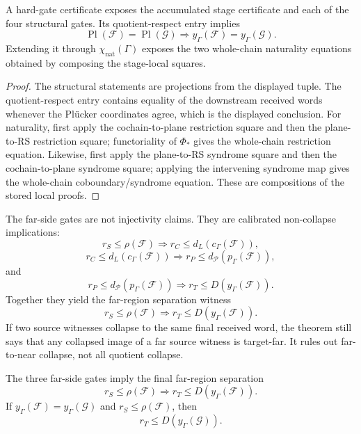 \begin{proposition}\label{prop:hard-gate-projections}
A hard-gate certificate exposes the accumulated stage certificate and each of
the four structural gates. Its quotient-respect entry implies
\[
  \operatorname{Pl}(\mathcal F)=\operatorname{Pl}(\mathcal G)
  \Longrightarrow
  y_\Gamma(\mathcal F)=y_\Gamma(\mathcal G).
\]
Extending it through \(\chi_{\mathrm{nat}}(\Gamma)\) exposes the two
whole-chain naturality equations obtained by composing the stage-local
squares.
\end{proposition}

\begin{proof}
The structural statements are projections from the displayed tuple. The
quotient-respect entry contains equality of the downstream received
words whenever the Pl\"ucker coordinates agree, which is the displayed
conclusion.  For naturality, first apply the cochain-to-plane restriction
square and then the plane-to-RS restriction square; functoriality of
\(\Phi_\ast\) gives the whole-chain restriction equation.  Likewise, first
apply the plane-to-RS syndrome square and then the cochain-to-plane syndrome
square; applying the intervening syndrome map gives the whole-chain
coboundary/syndrome equation.  These are compositions of the stored local
proofs.
\end{proof}

The far-side gates are not injectivity claims. They are calibrated
non-collapse implications:
\[
  r_S\le \rho(\mathcal F)
  \Longrightarrow
  r_C\le d_L(c_\Gamma(\mathcal F)),
\]
\[
  r_C\le d_L(c_\Gamma(\mathcal F))
  \Longrightarrow
  r_P\le d_{\mathcal P}(p_\Gamma(\mathcal F)),
\]
and
\[
  r_P\le d_{\mathcal P}(p_\Gamma(\mathcal F))
  \Longrightarrow
  r_T\le D(y_\Gamma(\mathcal F)).
\]
Together they yield the far-region separation witness
\[
  r_S\le \rho(\mathcal F)
  \Longrightarrow
  r_T\le D(y_\Gamma(\mathcal F)).
\]
If two source witnesses collapse to the same final received word, the theorem
still says that any collapsed image of a far source witness is target-far. It
rules out far-to-near collapse, not all quotient collapse.

\begin{proposition}\label{prop:far-gate-composition}
The three far-side gates imply the final far-region separation
\[
  r_S\le \rho(\mathcal F)
  \Longrightarrow
  r_T\le D(y_\Gamma(\mathcal F)).
\]
If \(y_\Gamma(\mathcal F)=y_\Gamma(\mathcal G)\) and
\(r_S\le \rho(\mathcal F)\), then
\[
  r_T\le D(y_\Gamma(\mathcal G)).
\]
\end{proposition}

